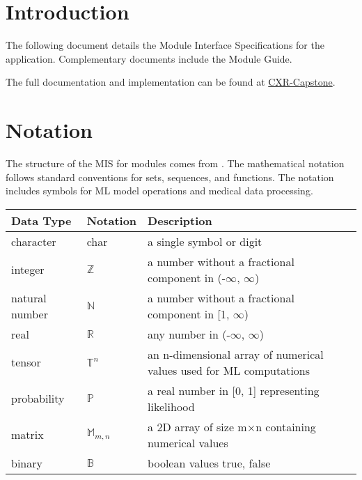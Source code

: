 \documentclass[12pt, titlepage]{article}
\begin{document}
\newpage

\tableofcontents

\newpage


\section{Introduction}

The following document details the Module Interface Specifications for the
 application. Complementary documents include the Module Guide.

\noindent The full documentation and implementation can be found at \href{https://github.com/RezaJodeiri/CXR-Capstone}{CXR-Capstone}.

\section{Notation}
The structure of the MIS for modules comes from \citet{HoffmanAndStrooper1995}. The mathematical notation follows standard conventions for sets, sequences, and functions. The notation includes symbols for ML model operations and medical data processing.
\begin{center}
    \renewcommand{\arraystretch}{1.2}
    \noindent 
    \begin{tabular}{l l p{7.5cm}} 
    \toprule 
    \textbf{Data Type} & \textbf{Notation} & \textbf{Description}\\ 
    \midrule
    character & char & a single symbol or digit\\
    integer & $\mathbb{Z}$ & a number without a fractional component in (-$\infty$, $\infty$)\\
    natural number & $\mathbb{N}$ & a number without a fractional component in [1, $\infty$)\\
    real & $\mathbb{R}$ & any number in (-$\infty$, $\infty$)\\
    tensor & $\mathbb{T}^{n}$ & an n-dimensional array of numerical values used for ML computations\\
    probability & $\mathbb{P}$ & a real number in [0, 1] representing likelihood\\
    matrix & $\mathbb{M}_{m,n}$ & a 2D array of size m×n containing numerical values\\
    binary & $\mathbb{B}$ & boolean values {true, false}\\
    \bottomrule
    \end{tabular} 
    \end{center}
\end{document}

